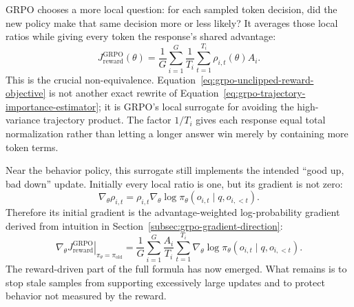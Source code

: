 GRPO chooses a more local question: for each sampled token decision, did the new policy
make that same decision more or less likely? It averages those local ratios while giving
every token the response's shared advantage:
\begin{equation}
  J_{\mathrm{reward}}^{\mathrm{GRPO}}(\theta)
  =\frac{1}{G}\sum_{i=1}^{G}\frac{1}{T_i}\sum_{t=1}^{T_i}
    \rho_{i,t}(\theta)A_i.
  \label{eq:grpo-unclipped-reward-objective}
\end{equation}
This is the crucial non-equivalence. Equation~\ref{eq:grpo-unclipped-reward-objective} is
not another exact rewrite of Equation~\ref{eq:grpo-trajectory-importance-estimator}; it is
GRPO's local surrogate for avoiding the high-variance trajectory product. The factor
$1/T_i$ gives each response equal total normalization rather than letting a longer answer
win merely by containing more token terms.

Near the behavior policy, this surrogate still implements the intended ``good up, bad
down'' update. Initially every local ratio is one, but its gradient is not zero:
\begin{equation}
  \nabla_\theta\rho_{i,t}
  =\rho_{i,t}\nabla_\theta\log\pi_\theta(o_{i,t}\mid q,o_{i,<t}).
  \label{eq:grpo-ratio-gradient}
\end{equation}
Therefore its initial gradient is the advantage-weighted log-probability gradient derived
from intuition in Section~\ref{subsec:grpo-gradient-direction}:
\begin{equation}
  \left.\nabla_\theta J_{\mathrm{reward}}^{\mathrm{GRPO}}\right|_{\pi_\theta=\pi_{\mathrm{old}}}
  =\frac{1}{G}\sum_{i=1}^{G}\frac{A_i}{T_i}\sum_{t=1}^{T_i}
    \nabla_\theta\log\pi_\theta(o_{i,t}\mid q,o_{i,<t}).
  \label{eq:grpo-advantage-weighted-gradient}
\end{equation}
The reward-driven part of the full formula has now emerged. What remains is to stop stale
samples from supporting excessively large updates and to protect behavior not measured by
the reward.
